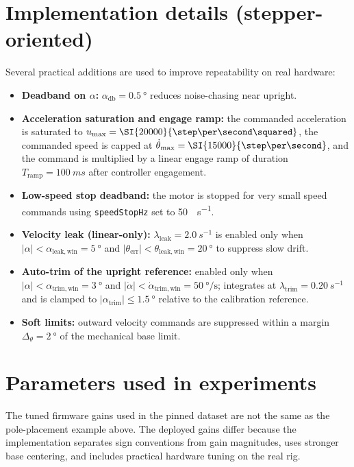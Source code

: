 \section{Implementation details (stepper-oriented)}
Several practical additions are used to improve repeatability on real hardware:
\begin{itemize}
  \item \textbf{Deadband on $\alpha$:} $\alpha_{\mathrm{db}}=\SI{0.5}{\degree}$ reduces noise-chasing near upright.
  \item \textbf{Acceleration saturation and engage ramp:} the commanded acceleration is saturated to $u_{\max}=\SI{20000}{\step\per\second\squared}$, the commanded speed is capped at $\dot{\theta}_{\max}=\SI{15000}{\step\per\second}$, and the command is multiplied by a linear engage ramp of duration $T_{\mathrm{ramp}}=\SI{100}{ms}$ after controller engagement.
  \item \textbf{Low-speed stop deadband:} the motor is stopped for very small speed commands using \texttt{speedStopHz} set to \SI{50}{\step\per\second}.
  \item \textbf{Velocity leak (linear-only):} $\lambda_{\mathrm{leak}}=\SI{2.0}{s^{-1}}$ is enabled only when $|\alpha|<\alpha_{\mathrm{leak,win}}=\SI{5}{\degree}$ and $|\theta_{\mathrm{err}}|<\theta_{\mathrm{leak,win}}=\SI{20}{\degree}$ to suppress slow drift.
  \item \textbf{Auto-trim of the upright reference:} enabled only when $|\alpha|<\alpha_{\mathrm{trim,win}}=\SI{3}{\degree}$ and $|\dot{\alpha}|<\dot{\alpha}_{\mathrm{trim,win}}=\SI{50}{\degree\per\second}$; integrates at $\lambda_{\mathrm{trim}}=\SI{0.20}{s^{-1}}$ and is clamped to $|\alpha_{\mathrm{trim}}|\le \SI{1.5}{\degree}$ relative to the calibration reference.
  \item \textbf{Soft limits:} outward velocity commands are suppressed within a margin $\Delta_\theta=\SI{2}{\degree}$ of the mechanical base limit.
\end{itemize}

\section{Parameters used in experiments}
The tuned firmware gains used in the pinned dataset are not the same as the pole-placement example above. The deployed gains differ because the implementation separates sign conventions from gain magnitudes, uses stronger base centering, and includes practical hardware tuning on the real rig.

